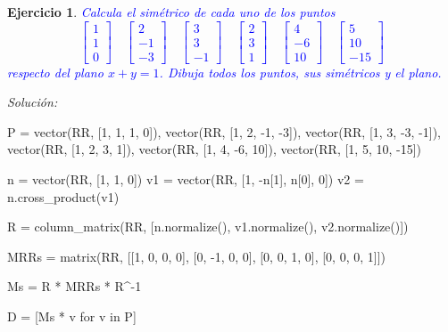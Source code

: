 \documentclass{amsart}
\newtheorem{ejer}{Ejercicio}
\begin{document}
\newpage


\begin{ejer}
\textcolor{blue}{Calcula el simétrico de cada uno de los puntos
$$
	\left[\begin{array}{c}1\\1\\0\end{array}\right] \quad
	\left[\begin{array}{c}2\\-1\\-3\end{array}\right] \quad
	\left[\begin{array}{c}3\\3\\-1\end{array}\right] \quad
	\left[\begin{array}{c}2\\3\\1\end{array}\right] \quad
	\left[\begin{array}{c}4\\-6\\10\end{array}\right] \quad
	\left[\begin{array}{c}5\\10\\-15\end{array}\right]
$$ 
respecto del plano $x+y=1$. Dibuja todos los puntos, sus simétricos y el plano.}
\end{ejer}

{\it Solución:}

\begin{sageblock}
P = vector(RR, [1, 1, 1, 0]), vector(RR, [1, 2, -1, -3]), vector(RR, [1, 3, -3, -1]), vector(RR, [1, 2, 3, 1]), vector(RR, [1, 4, -6, 10]), vector(RR, [1, 5, 10, -15])

n = vector(RR, [1, 1, 0])
v1 = vector(RR, [1, -n[1], n[0], 0])
v2 = n.cross_product(v1)


R = column_matrix(RR, [n.normalize(), v1.normalize(), v2.normalize()])

MRRs = matrix(RR, [[1, 0, 0, 0], [0, -1, 0, 0],  [0, 0, 1, 0], [0, 0, 0, 1]])

Ms = R * MRRs * R^-1

D = [Ms * v for v in P]


\end{sageblock}
\end{document}
